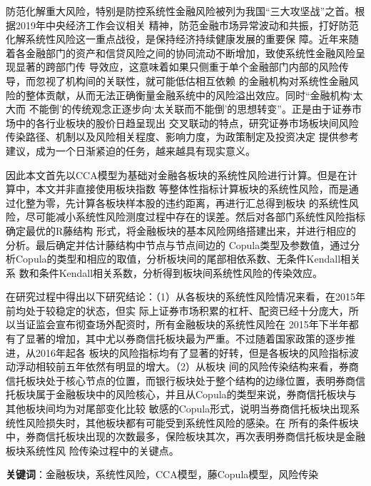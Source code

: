\begin{cabstract}
  \renewcommand{\chapterlabel}{摘\hspace{2em}要}

 防范化解重大风险，特别是防控系统性金融风险被列为我国“三大攻坚战”之首。根据2019年中央经济工作会议相关
精神，防范金融市场异常波动和共振，打好防范化解系统性风险这一重点战役，是保持经济持续健康发展的重要保
障。近年来随着各金融部门的资产和信贷风险之间的协同流动不断增加，致使系统性金融风险呈现显著的跨部门传
导效应，这意味着如果只侧重于单个金融部门内部的风险传导，而忽视了机构间的关联性，就可能低估相互依赖
的金融机构对系统性金融风险的整体贡献，从而无法正确衡量金融系统中的风险溢出效应。同时“金融机构‘太大而
不能倒’的传统观念正逐步向‘太关联而不能倒’的思想转变”。正是由于证券市场中的各行业板块的股价日趋呈现出
交叉联动的特点，研究证券市场板块间风险传染路径、机制以及风险相关程度、影响力度，为政策制定及投资决定
提供参考建议，成为一个日渐紧迫的任务，越来越具有现实意义。

因此本文首先以CCA模型为基础对金融各板块的系统性风险进行计算。但是在计算中，本文并非直接使用板块指数
等整体性指标计算板块的系统性风险，而是通过化整为零，先计算各板块样本股的违约距离，再进行汇总得到板块
的系统性风险，尽可能减小系统性风险测度过程中存在的误差。然后对各部门系统性风险指标确定最优的R藤结构
形式，将金融板块的基本风险网络搭建出来，并进行相应的分析。最后确定并估计藤结构中节点与节点间边的
Copula类型及参数值，通过分析Copula的类型和相应的取值，分析板块间的尾部相依系数、无条件Kendall相关系
数和条件Kendall相关系数，分析得到板块间系统性风险的传染效应。

在研究过程中得出以下研究结论：（1）从各板块的系统性风险情况来看，在2015年前均处于较稳定的状态，但实
际上证券市场积累的杠杆、配资已经十分庞大，所以当证监会宣布彻查场外配资时，所有金融板块的系统性风险在
2015年下半年都有了显著的增加，其中尤以券商信托板块最为严重。不过随着国家政策的逐步推进，从2016年起各
板块的风险指标均有了显著的好转，但是各板块的风险指标波动浮动相较前五年依然有明显的增大。（2）从板块
间的风险传染结构来看，券商信托板块处于核心节点的位置，而银行板块处于整个结构的边缘位置，表明券商信
托板块属于金融板块中的风险核心，并且从Copula的类型来说，券商信托板块与其他板块间均为对尾部变化比较
敏感的Copula形式，说明当券商信托板块出现系统性风险损失时，其他板块都有可能受到系统性风险的感染。在
所有的条件板块中，券商信托板块出现的次数最多，保险板块其次，再次表明券商信托板块是金融板块系统性风
险传染过程中的关键点。 
  
  \bigbreak

  {\bfseries 关键词}：金融板块，系统性风险，CCA模型，藤Copula模型，风险传染
   

\end{cabstract}




